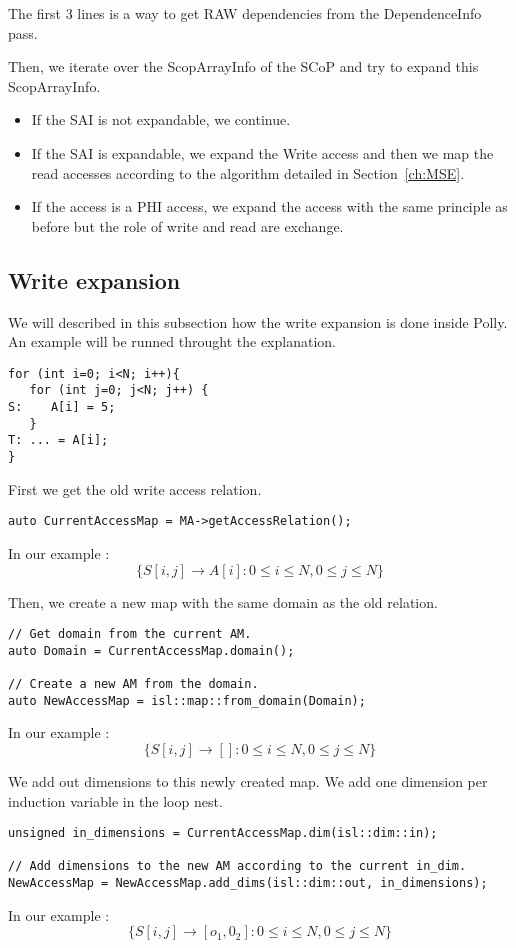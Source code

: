 The first 3 lines is a way to get RAW dependencies from the DependenceInfo pass.

Then, we iterate over the ScopArrayInfo of the SCoP and try to expand this ScopArrayInfo.
\begin{itemize}
\item If the SAI is not expandable, we continue.
\item If the SAI is expandable, we expand the Write access and then we map the read accesses according to the algorithm detailed in Section~\ref{ch:MSE}.
\item If the access is a PHI access,  we expand the access with the same principle as before but the role of write and read are exchange.
\end{itemize}

\subsection{Write expansion}
We will described in this subsection how the write expansion is done inside Polly. An example will be runned throught the explanation. 
\begin{lstlisting}[frame=single]
for (int i=0; i<N; i++){
   for (int j=0; j<N; j++) {
S:    A[i] = 5;
   }
T: ... = A[i];
}
\end{lstlisting}

First we get the old write access relation.
\begin{lstlisting}[frame=single]
auto CurrentAccessMap = MA->getAccessRelation();
\end{lstlisting}
In our example :
\[
\{ S[i, j] \rightarrow A[i] : 0 \le i \le N, 0 \le j \le N\}
\]

Then, we create a new map with the same domain as the old relation.
\begin{lstlisting}[frame=single]
// Get domain from the current AM.
auto Domain = CurrentAccessMap.domain();

// Create a new AM from the domain.
auto NewAccessMap = isl::map::from_domain(Domain);
\end{lstlisting}
In our example :
\[
\{ S[i, j] \rightarrow [] : 0 \le i \le N, 0 \le j \le N\}
\]

We add out dimensions to this newly created map. We add one dimension per induction variable in the loop nest.
\begin{lstlisting}[frame=single]
unsigned in_dimensions = CurrentAccessMap.dim(isl::dim::in);

// Add dimensions to the new AM according to the current in_dim.
NewAccessMap = NewAccessMap.add_dims(isl::dim::out, in_dimensions);
\end{lstlisting}
In our example :
\[
\{ S[i, j] \rightarrow [o_1, 0_2] : 0 \le i \le N, 0 \le j \le N\}
\]

